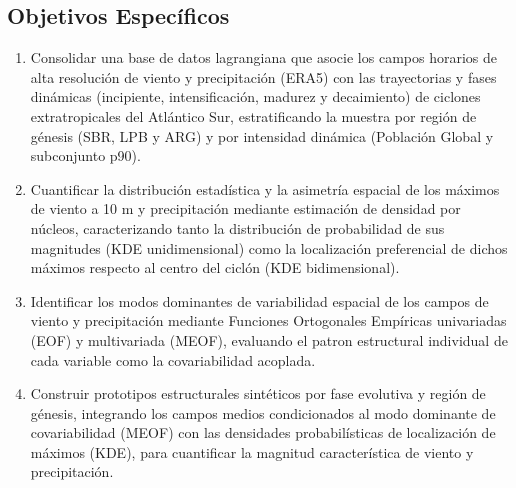 \subsection{Objetivos Específicos}
\begin{enumerate}
    \item Consolidar una base de datos lagrangiana que asocie los campos horarios de alta resolución de viento y precipitación
    (ERA5) con las trayectorias y fases dinámicas (incipiente, intensificación, madurez y decaimiento) de ciclones
    extratropicales del Atlántico Sur, estratificando la muestra por región de génesis (SBR, LPB y ARG) y por intensidad
    dinámica (Población Global y subconjunto p90).
    \item Cuantificar la distribución estadística y la asimetría espacial de los máximos de viento a 10 m y precipitación
    mediante estimación de densidad por núcleos, caracterizando tanto la distribución de probabilidad de sus magnitudes (KDE
    unidimensional) como la localización preferencial de dichos máximos respecto al centro del ciclón (KDE bidimensional).
    \item Identificar los modos dominantes de variabilidad espacial de los campos de viento y precipitación mediante Funciones
    Ortogonales Empíricas univariadas (EOF) y multivariada (MEOF), evaluando el patron estructural individual de cada variable
    como la covariabilidad acoplada.
    \item Construir prototipos estructurales sintéticos por fase evolutiva y región de génesis, integrando los campos medios
    condicionados al modo dominante de covariabilidad (MEOF) con las densidades probabilísticas de localización de máximos
    (KDE), para cuantificar la magnitud característica de viento y precipitación.
    

\end{enumerate}

